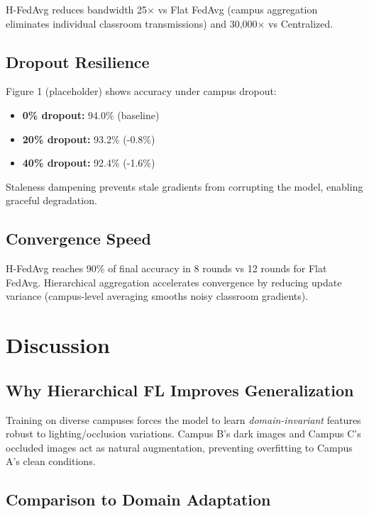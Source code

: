 \documentclass[conference]{IEEEtran}
\begin{document}
H-FedAvg reduces bandwidth 25$\times$ vs Flat FedAvg (campus aggregation eliminates individual classroom transmissions) and 30,000$\times$ vs Centralized.

\subsection{Dropout Resilience}

Figure 1 (placeholder) shows accuracy under campus dropout:

\begin{itemize}
    \item \textbf{0\% dropout:} 94.0\% (baseline)
    \item \textbf{20\% dropout:} 93.2\% (-0.8\%)
    \item \textbf{40\% dropout:} 92.4\% (-1.6\%)
\end{itemize}

Staleness dampening prevents stale gradients from corrupting the model, enabling graceful degradation.

\subsection{Convergence Speed}

H-FedAvg reaches 90\% of final accuracy in 8 rounds vs 12 rounds for Flat FedAvg. Hierarchical aggregation accelerates convergence by reducing update variance (campus-level averaging smooths noisy classroom gradients).

\section{Discussion}

\subsection{Why Hierarchical FL Improves Generalization}

Training on diverse campuses forces the model to learn \textit{domain-invariant} features robust to lighting/occlusion variations. Campus B's dark images and Campus C's occluded images act as natural augmentation, preventing overfitting to Campus A's clean conditions.

\subsection{Comparison to Domain Adaptation}
\end{document}
